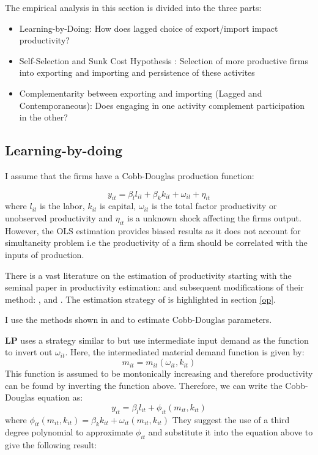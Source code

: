 \documentclass[12pt]{article}
\begin{document}
The empirical analysis in this section is divided into the  three
parts:
\begin{itemize}
\item Learning-by-Doing: How does lagged choice of export/import
  impact productivity?
\item Self-Selection and Sunk Cost Hypothesis : Selection of more productive firms into
  exporting and importing and persistence of these activites 
\item Complementarity between exporting and importing (Lagged and
  Contemporaneous): Does engaging
  in one activity complement participation in the other?
\end{itemize}

\subsection{Learning-by-doing}\label{sec:lbd}

 I assume that the firms have a Cobb-Douglas
production function: 

\begin{equation}
y_{it} =   \beta_{l}l_{it} + \beta_{k}k_{it} +
\omega_{it} + \eta_{it} 
\end{equation}
where $l_{it}$ is the labor, $k_{it}$ is capital, $\omega_{it}$ is the
total factor productivity or unobserved productivity and $\eta_{it}$
is a unknown shock affecting the firms output. However, the OLS
estimation provides biased results as it does not account for
simultaneity problem i.e the productivity of a firm should be
correlated with the inputs of production. 

There is a vast literature on the estimation of productivity starting
with the seminal paper in productivity estimation: \textcite{olley1992dynamics} and subsequent
modifications of their method: \textcite{levinsohn2003estimating},
\textcite{ackerberg2006structural} and
\textcite{wooldridge2009estimating}. The estimation strategy of
\textcite{olley1992dynamics} is highlighted in section \ref{op}. 

I use the  methods shown in \textcite{levinsohn2003estimating} and
\textcite{ackerberg2006structural} to estimate Cobb-Douglas
parameters. 


\textcite{levinsohn2003estimating} \textbf{LP} uses a  strategy
similar to \textcite{olley1992dynamics} but use intermediate input demand
as the function to invert out $\omega_{it}$. 
Here, the intermediated material demand function is given by:
$$  m_{it} = m_{it}(\omega_{it}, k_{it})$$
This function is assumed to be montonically increasing and therefore
productivity can be found by inverting the function above. Therefore,
we can write the Cobb-Douglas equation  as: 
$$ y_{it} = \beta_{l}l_{it} + \phi_{it}(m_{it},k_{it})$$
where $\phi_{it}(m_{it},k_{it}) =  \beta_{k}k_{it}+ \omega_{it}(m_{it}, k_{it})$
They suggest the  use of a third degree polynomial to approximate 
$\phi_{it}$ and substitute it into the equation above to give the
following result: 
\end{document}
